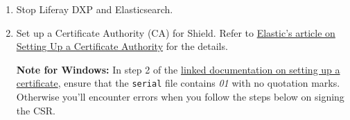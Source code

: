 \begin{enumerate}
\def\labelenumi{\arabic{enumi}.}
\item
  Stop Liferay DXP and Elasticsearch.
\item
  Set up a Certificate Authority (CA) for Shield. Refer to
  \href{https://www.elastic.co/guide/en/shield/2.4/certificate-authority.html\#certificate-authority}{Elastic's
  article on Setting Up a Certificate Authority} for the details.

  \textbf{Note for Windows:} In step 2 of the
  \href{https://www.elastic.co/guide/en/shield/2.4/certificate-authority.html\#certificate-authority}{linked
  documentation on setting up a certificate}, ensure that the
  \texttt{serial} file contains \emph{01} with no quotation marks.
  Otherwise you'll encounter errors when you follow the steps below on
  signing the CSR.
\end{enumerate}

\noindent\hrulefill

